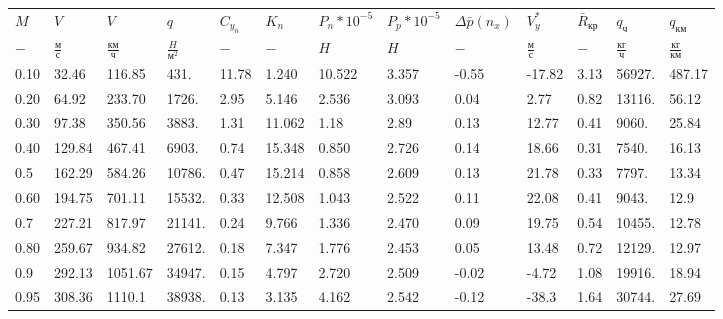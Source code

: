 \begin{tabular}{lllllllllllll}
$M$ & $V$ & $V$ & $q$ & $C_{y_n}$ & $K_n$ & $P_n*10^{-5}$ & $P_p*10^{-5}$ & $\Delta \bar{p}(n_x)$ & $V_y^*$ & $\bar{R}_{кр}$ & $q_{ч}$ & $q_{км}$ \\
$-$ & $\frac{м}{с}$ & $\frac{км}{ч}$ & $\frac{H}{м^2}$ & $-$ & $-$ & $H$ & $H$ & $-$ & $\frac{м}{с}$ & $-$ & $\frac{кг}{ч}$ & $\frac{кг}{км}$ \\
0.10 & 32.46 & 116.85 & 431. & 11.78 & 1.240 & 10.522 & 3.357 & -0.55 & -17.82 & 3.13 & 56927. & 487.17 \\
0.20 & 64.92 & 233.70 & 1726. & 2.95 & 5.146 & 2.536 & 3.093 & 0.04 & 2.77 & 0.82 & 13116. & 56.12 \\
0.30 & 97.38 & 350.56 & 3883. & 1.31 & 11.062 & 1.18 & 2.89 & 0.13 & 12.77 & 0.41 & 9060. & 25.84 \\
0.40 & 129.84 & 467.41 & 6903. & 0.74 & 15.348 & 0.850 & 2.726 & 0.14 & 18.66 & 0.31 & 7540. & 16.13 \\
0.5 & 162.29 & 584.26 & 10786. & 0.47 & 15.214 & 0.858 & 2.609 & 0.13 & 21.78 & 0.33 & 7797. & 13.34 \\
0.60 & 194.75 & 701.11 & 15532. & 0.33 & 12.508 & 1.043 & 2.522 & 0.11 & 22.08 & 0.41 & 9043. & 12.9 \\
0.7 & 227.21 & 817.97 & 21141. & 0.24 & 9.766 & 1.336 & 2.470 & 0.09 & 19.75 & 0.54 & 10455. & 12.78 \\
0.80 & 259.67 & 934.82 & 27612. & 0.18 & 7.347 & 1.776 & 2.453 & 0.05 & 13.48 & 0.72 & 12129. & 12.97 \\
0.9 & 292.13 & 1051.67 & 34947. & 0.15 & 4.797 & 2.720 & 2.509 & -0.02 & -4.72 & 1.08 & 19916. & 18.94 \\
0.95 & 308.36 & 1110.1 & 38938. & 0.13 & 3.135 & 4.162 & 2.542 & -0.12 & -38.3 & 1.64 & 30744. & 27.69 \\
\end{tabular}
